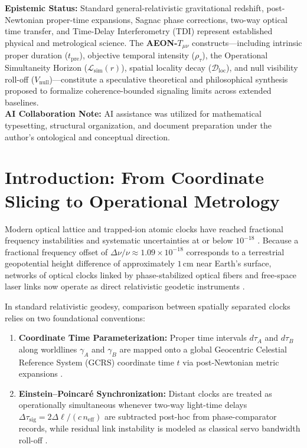 \documentclass[11pt,a4paper]{article}
\begin{document}
\begin{tcolorbox}[colback=gray!6,colframe=gray!50!black,title=\textbf{Epistemic Status \& AI Collaboration Disclosure},fonttitle=\small\bfseries,boxrule=0.6pt]
\small
\textbf{Epistemic Status:} Standard general-relativistic gravitational redshift, post-Newtonian proper-time expansions, Sagnac phase corrections, two-way optical time transfer, and Time-Delay Interferometry (TDI) represent established physical and metrological science. The \textbf{AEON-$T_{\mu\nu}$} constructs---including intrinsic proper duration ($t_{\mathrm{pre}}$), objective temporal intensity ($\rho_\tau$), the Operational Simultaneity Horizon ($\mathcal{L}_{\mathrm{sim}}(r)$), spatial locality decay ($\mathcal{D}_{\mathrm{loc}}$), and null visibility roll-off ($V_{\mathrm{null}}$)---constitute a speculative theoretical and philosophical synthesis proposed to formalize coherence-bounded signaling limits across extended baselines.\\[4pt]
\textbf{AI Collaboration Note:} AI assistance was utilized for mathematical typesetting, structural organization, and document preparation under the author's ontological and conceptual direction.
\end{tcolorbox}

\section{Introduction: From Coordinate Slicing to Operational Metrology}

Modern optical lattice and trapped-ion atomic clocks have reached fractional frequency instabilities and systematic uncertainties at or below $10^{-18}$ \cite{bloom2014,mcgrew2018,bothwell2022}. Because a fractional frequency offset of $\Delta\nu / \nu \approx 1.09 \times 10^{-18}$ corresponds to a terrestrial geopotential height difference of approximately $1\,\mathrm{cm}$ near Earth's surface, networks of optical clocks linked by phase-stabilized optical fibers \cite{predehl2012,lisdat2016} and free-space laser links \cite{giorgetta2013,cacciapuoti2020} now operate as direct relativistic geodetic instruments \cite{bjerhammar1985,mehlstaubler2018}.

In standard relativistic geodesy, comparison between spatially separated clocks relies on two foundational conventions:
\begin{enumerate}[leftmargin=1.6em]
    \item \textbf{Coordinate Time Parameterization:} Proper time intervals $d\tau_A$ and $d\tau_B$ along worldlines $\gamma_A$ and $\gamma_B$ are mapped onto a global Geocentric Celestial Reference System (GCRS) coordinate time $t$ via post-Newtonian metric expansions \cite{soffel2003,petit2010}.
    \item \textbf{Einstein--Poincaré Synchronization:} Distant clocks are treated as operationally simultaneous whenever two-way light-time delays $\Delta\tau_{\mathrm{sig}} = 2\Delta\ell / (c\,n_{\mathrm{eff}})$ are subtracted post-hoc from phase-comparator records, while residual link instability is modeled as classical servo bandwidth roll-off \cite{williams2008}.
\end{enumerate}
\end{document}
